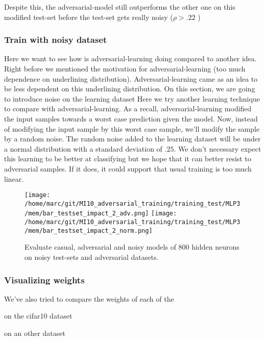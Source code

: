 			Despite this, the adversarial-model still outperforms the other one on this modified test-set before the test-set gets really noisy ($\rho>.22$ )



		\subsubsection{Train with noisy dataset}
		\label{ssub:train_with_noisy_dataset}
			Here we want to see how is adversarial-learning doing compared to another idea. Right before we mentioned the motivation for adversarial-learning (too much dependence on underlining distribution). Adversarial-learning came as an idea to be less dependent on this underlining distribution. On this section, we are going to introduce noise on the learning dataset 
			Here we try another learning technique to compare with adversarial-learning. As a recall, adversarial-learning modified the input samples towards a worst case prediction given the model. Now, instead of modifying the input sample by this worst case sample, we'll modify the sample by a random noise. The random noise added to the learning dataset will be under a normal distribution with a standard deviation of $.25$. We don't necessary expect this learning to be better at classifying but we hope that it can better resist to adversarial samples. If it does, it could support that usual training is too much linear.

			\begin{figure}
				\centering
				\texttt{[image: /home/marc/git/MI10\_adversarial\_training/training\_test/MLP3/mem/bar\_testset\_impact\_2\_adv.png]}
				\texttt{[image: /home/marc/git/MI10\_adversarial\_training/training\_test/MLP3/mem/bar\_testset\_impact\_2\_norm.png]}
				\caption{Evaluate casual, adversarial and noisy models of 800 hidden neurons on noisy test-sets and adversarial datasets.}
				\label{fig:mnist_neurons}
			\end{figure}

			
		\subsubsection{Visualizing weights}
		\label{ssub:visualizing_weights}
			We've also tried to compare the weights of each of the 
		

	

	on the cifar10 dataset

	on an other dataset






